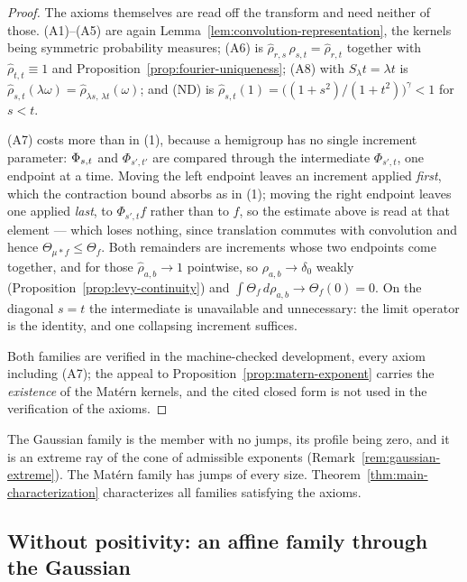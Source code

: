 \begin{proof}
The axioms themselves are read off the transform and need neither of those. (A1)--(A5) are
again Lemma~\ref{lem:convolution-representation}, the kernels being symmetric probability
measures; (A6) is $\hat\rho_{r,s}\,\hat\rho_{s,t} = \hat\rho_{r,t}$ together with
$\hat\rho_{t,t} \equiv 1$ and Proposition~\ref{prop:fourier-uniqueness}; (A8) with
$S_\lambda t = \lambda t$ is $\hat\rho_{s,t}(\lambda\omega) = \hat\rho_{\lambda s,\,\lambda t}(\omega)$;
and (ND) is $\hat\rho_{s,t}(1) = \bigl((1+s^2)/(1+t^2)\bigr)^{\gamma} < 1$ for $s < t$.

(A7) costs more than in (1), because a hemigroup has no single increment parameter:
$\Phi_{s,t}$ and $\Phi_{s',t'}$ are compared through the intermediate $\Phi_{s',t}$, one
endpoint at a time. Moving the left endpoint leaves an increment applied \emph{first}, which
the contraction bound absorbs as in (1); moving the right endpoint leaves one applied
\emph{last}, to $\Phi_{s',t}f$ rather than to $f$, so the estimate above is read at that
element --- which loses nothing, since translation commutes with convolution and hence
$\Theta_{\mu * f} \le \Theta_f$. Both remainders are increments whose two endpoints come
together, and for those $\hat\rho_{a,b} \to 1$ pointwise, so $\rho_{a,b} \to \delta_0$ weakly
(Proposition~\ref{prop:levy-continuity}) and $\int \Theta_f\,d\rho_{a,b} \to \Theta_f(0) = 0$.
On the diagonal $s = t$ the intermediate is unavailable and unnecessary: the limit operator
is the identity, and one collapsing increment suffices.

Both families are verified in the machine-checked development, every axiom including (A7);
the appeal to Proposition~\ref{prop:matern-exponent} carries the \emph{existence} of the
Mat\'ern kernels, and the cited closed form is not used in the verification of the axioms.
\end{proof}

The Gaussian family is the member with no jumps, its profile being zero, and it is an
extreme ray of the cone of admissible exponents (Remark~\ref{rem:gaussian-extreme}). The
Mat\'ern family has jumps of every size. Theorem~\ref{thm:main-characterization}
characterizes all families satisfying the axioms.



\subsection{Without positivity: an affine family through the Gaussian}\label{sec:axioms-nopositivity}

